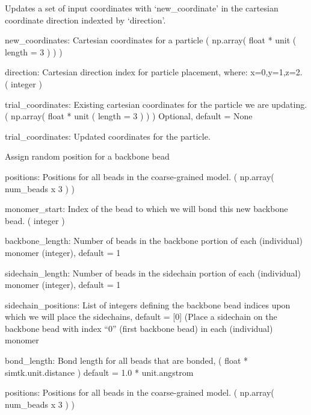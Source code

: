 \documentclass[letterpaper,10pt,english]{sphinxmanual}
\begin{document}
\begin{fulllineitems}
\label{\detokenize{index:utilities.util.append_position}}
Updates a set of input coordinates with ‘new\_coordinate’ in the
cartesian coordinate direction indexted by ‘direction’.

new\_coordinates: Cartesian coordinates for a particle
( np.array( float * unit ( length = 3 ) ) )

direction: Cartesian direction index for particle placement, 
where: x=0,y=1,z=2. 
( integer )

trial\_coordinates: Existing cartesian coordinates for the particle
we are updating.
( np.array( float * unit ( length = 3 ) ) )
Optional, default = None

trial\_coordinates: Updated coordinates for the particle.

\end{fulllineitems}


\begin{fulllineitems}
\label{\detokenize{index:utilities.util.assign_backbone_beads}}
Assign random position for a backbone bead

positions: Positions for all beads in the coarse-grained model.
( np.array( num\_beads x 3 ) )

monomer\_start: Index of the bead to which we will bond this
new backbone bead.
( integer )

backbone\_length: Number of beads in the backbone
portion of each (individual) monomer (integer), default = 1

sidechain\_length: Number of beads in the sidechain
portion of each (individual) monomer (integer), default = 1

sidechain\_positions: List of integers defining the backbone
bead indices upon which we will place the sidechains,
default = {[}0{]} (Place a sidechain on the backbone bead with
index “0” (first backbone bead) in each (individual) monomer

bond\_length: Bond length for all beads that are bonded,
( float * simtk.unit.distance )
default = 1.0 * unit.angstrom

positions: Positions for all beads in the coarse-grained model.
( np.array( num\_beads x 3 ) )

\end{fulllineitems}
\end{document}
